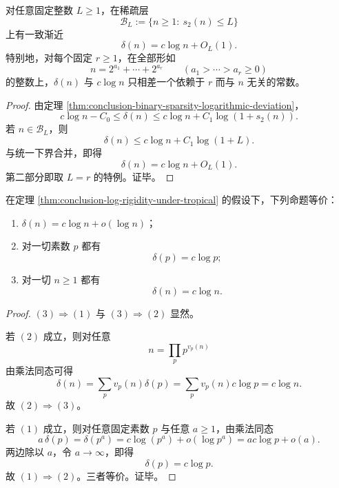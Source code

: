 \begin{corollary}\label{cor:conclusion-bounded-popcount-exact-log-rigidity}
对任意固定整数 \(L\ge 1\)，在稀疏层
\[
\mathcal B_L:=\{n\ge 1:\ s_2(n)\le L\}
\]
上有一致渐近
\[
\delta(n)=c\log n+O_L(1).
\]
特别地，对每个固定 \(r\ge 1\)，在全部形如
\[
n=2^{a_1}+\cdots+2^{a_r}
\qquad
(a_1>\cdots>a_r\ge 0)
\]
的整数上，\(\delta(n)\) 与 \(c\log n\) 只相差一个依赖于 \(r\) 而与 \(n\) 无关的常数。
\end{corollary}
\begin{proof}
由定理 \ref{thm:conclusion-binary-sparsity-logarithmic-deviation}，
\[
c\log n-C_0
\le
\delta(n)
\le
c\log n+C_1\log(1+s_2(n)).
\]
若 \(n\in\mathcal B_L\)，则
\[
\delta(n)\le c\log n+C_1\log(1+L).
\]
与统一下界合并，即得
\[
\delta(n)=c\log n+O_L(1).
\]
第二部分即取 \(L=r\) 的特例。证毕。
\end{proof}

\begin{theorem}\label{thm:conclusion-sublinear-error-forces-exact-logarithm}
在定理 \ref{thm:conclusion-log-rigidity-under-tropical} 的假设下，下列命题等价：
\begin{enumerate}
  \item \(\delta(n)=c\log n+o(\log n)\)；
  \item 对一切素数 \(p\) 都有
  \[
  \delta(p)=c\log p;
  \]
  \item 对一切 \(n\ge 1\) 都有
  \[
  \delta(n)=c\log n.
  \]
\end{enumerate}
\end{theorem}
\begin{proof}
\((3)\Rightarrow(1)\) 与 \((3)\Rightarrow(2)\) 显然。

若 \((2)\) 成立，则对任意
\[
n=\prod_p p^{v_p(n)}
\]
由乘法同态可得
\[
\delta(n)=\sum_p v_p(n)\delta(p)=\sum_p v_p(n)c\log p=c\log n.
\]
故 \((2)\Rightarrow(3)\)。

若 \((1)\) 成立，则对任意固定素数 \(p\) 与任意 \(a\ge 1\)，由乘法同态
\[
a\,\delta(p)=\delta(p^a)=c\log(p^a)+o(\log p^a)=ac\log p+o(a).
\]
两边除以 \(a\)，令 \(a\to\infty\)，即得
\[
\delta(p)=c\log p.
\]
故 \((1)\Rightarrow(2)\)。三者等价。证毕。
\end{proof}


